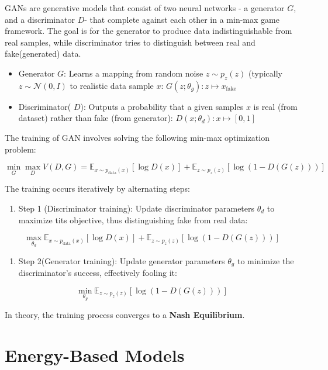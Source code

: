 \documentclass[
  12pt,
]{article}
\providecommand{\tightlist}{%
  \setlength{\itemsep}{0pt}\setlength{\parskip}{0pt}}\usepackage{longtable,booktabs,array}
\theoremstyle{plain}
\theoremstyle{remark}
\begin{document}
GANs are generative models that consist of two neural networks - a
generator \(G\), and a discriminator \(D\)- that complete against each
other in a min-max game framework. The goal is for the generator to
produce data indistinguishable from real samples, while discriminator
tries to distinguish between real and fake(generated) data.

\begin{itemize}
\tightlist
\item
  Generator \(G\): Learns a mapping from random noise \(z \sim p_z(z)\)
  (typically \(z \sim \mathcal{N}(0, I)\) to realistic data sample
  \(x\): \(G(z; \theta_g) : z \mapsto x_{\text{fake}}\)
\item
  Discriminator( \(D\)): Outputs a probability that a given samples
  \(x\) is real (from dataset) rather than fake (from generator):
  \(D(x; \theta_d): x \mapsto [0,1]\)
\end{itemize}

The training of GAN involves solving the following min-max optimization
problem:

\[
\min_{G}\max_{D} V(D, G) = \mathbb{E}_{x \sim p_{\text{data}}(x)}[\log D(x)] + \mathbb{E}_{z \sim p_z(z)}[\log(1 - D(G(z)))]
\]

The training occurs iteratively by alternating steps:

\begin{enumerate}
\def\labelenumi{\arabic{enumi}.}
\tightlist
\item
  Step 1 (Discriminator training): Update discriminator parameters
  \(\theta_d\) to maximize tits objective, thus distinguishing fake from
  real data:
\end{enumerate}

\[
\max_{\theta_d} \mathbb{E}_{x \sim p_{\text{data}}(x)}[\log D(x)] + \mathbb{E}_{z \sim p_z(z)}[\log(1 - D(G(z)))]
\]

\begin{enumerate}
\def\labelenumi{\arabic{enumi}.}
\setcounter{enumi}{1}
\tightlist
\item
  Step 2(Generator training): Update generator parameters \(\theta_g\)
  to minimize the discriminator's success, effectively fooling it:
\end{enumerate}

\[
\min_{\theta_g} \mathbb{E}_{z \sim p_z(z)}[\log(1 - D(G(z)))]
\]

In theory, the training process converges to a \textbf{Nash
Equilibrium}.

\section{Energy-Based Models}\label{energy-based-models}
\end{document}
